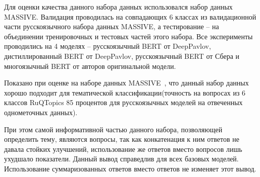 \begin{table}
\centering
{}
\caption{Размеры набора данных {RuQTopics} по классу и части}
\label{tab:RuQTopics:sizes}
\end{table}

Для оценки качества данного набора данных использовался набор данных MASSIVE. Валидация проводилась на совпадающих 6 классах из валидационной части русскоязычного набора данных MASSIVE, а тестирование -- на объединении тренировочных и тестовых частей этого набора. Все эксперименты проводились на 4 моделях -- русскоязычный BERT от DeepPavlov, дистиллированный BERT от DeepPavlov, русскоязычный BERT от Сбера и многоязычный BERT от авторов оригинальной модели.

Показано при оценке на наборе данных MASSIVE~\cite{massive}, что данный набор данных хорошо подходит для тематической классификации(точность на вопросах из 6 классов {RuQTopics} 85 процентов для русскоязычных моделей на отвеченных однометочных данных). 

При этом самой информативной частью данного набора, позволяющей определить тему, являются вопросы, так как конкатенация к ним ответов не давала стойких улучшений, использование же ответов вместо вопросов лишь ухудшало показатели. Данный вывод справедлив для всех базовых моделей. Использование суммаризованных ответов вместо ответов не изменяет этот вывод.

